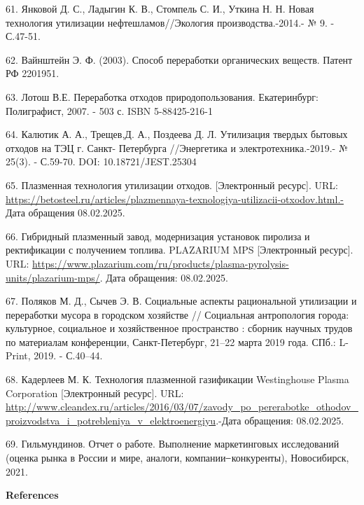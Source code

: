 \begin{references}
61. Янковой Д. С., Ладыгин К. В., Стомпель С. И., Уткина Н. Н. Новая
технология утилизации нефтеш­ламов//Экология производства.-2014.- № 9. -
С.47-51.

62. Вайнштейн Э. Ф. (2003). Способ переработки органических веществ.
Патент РФ 2201951.

63. Лотош В.Е. Переработка отходов природопользования. Екатеринбург:
Полиграфист, 2007. - 503 с. ISBN 5-88425-216-1

64. Калютик А. А., Трещев,Д. А., Поздеева Д. Л. Утилизация твердых
бытовых отходов на ТЭЦ г. Санкт- Петербурга //Энергетика и
электротехника.-2019.- № 25(3). - С.59-70. DOI: 10.18721/JEST.25304

65. Плазменная технология утилизации отходов. {[}Электронный ресурс{]}.
URL:
\url{https://betosteel.ru/articles/plazmennaya-texnologiya-utilizacii-otxodov.html.-}
Дата обращения 08.02.2025.

66. Гибридный плазменный завод, модернизация установок пиролиза и
ректификации с получением топлива. PLAZARIUM MPS {[}Электронный
ресурс{]}. URL:
\url{https://www.plazarium.com/ru/products/plasma-pyrolysis-units/plazarium-mps/}.
Дата обращения: 08.02.2025.

67. Поляков М. Д., Сычев Э. В. Социальные аспекты рациональной
утилизации и переработки мусора в городском хозяйстве // Социальная
антропология города: культурное, социальное и хозяйственное пространство
: сборник научных трудов по материалам конференции, Санкт-Петербург,
21--22 марта 2019 года. СПб.: L-Print, 2019. - С.40--44.

68. Кадерлеев М. К. Технология плазменной газификации Westinghouse
Plasma Corporation {[}Электронный ресурс{]}. URL:
\url{http://www.cleandex.ru/articles/2016/03/07/zavody_po_pererabotke_othodov_proizvodstva_i_potrebleniya_v_elektroenergiyu}.-Дата
обращения: 08.02.2025.

69. Гильмундинов. Отчет о работе. Выполнение маркетинговых исследований
(оценка рынка в России и мире, аналоги, компании ̶ конкуренты),
Новосибирск, 2021.
\end{references}

\begin{center}
{\bfseries References}
\end{center}

